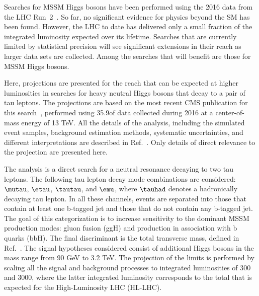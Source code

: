 Searches for MSSM Higgs bosons have been performed using
the 2016 data from the LHC Run~2~\cite{HIG-18-014,HIG-16-018,HIG-17-020}.
So far,
no significant evidence for physics beyond the SM has been found.
However, the LHC to date has delivered only a small fraction of the
integrated luminosity expected over its lifetime.
Searches that are currently limited by statistical precision
will see significant extensions in their reach as larger data sets are collected.
Among the searches that will benefit are those for MSSM Higgs bosons.

Here,
projections are presented for the reach that can be expected at higher luminosities
in searches for heavy neutral Higgs bosons that decay to a pair of tau leptons.
The projections are based on the most recent CMS publication
for this search~\cite{HIG-17-020},
performed using 35.9\fbinv of data collected during 2016
at a center-of-mass energy of 13 TeV.
All the details of the analysis,
including the simulated event samples, background estimation methods,
systematic uncertainties, and different interpretations are described in Ref.~\cite{HIG-17-020}.
Only details of direct relevance to the projection are presented here.

The analysis is a direct search for a neutral resonance
decaying to two tau leptons.
The following tau lepton decay mode combinations are considered: $\mutau$, $\etau$,
$\tautau$, and $\emu$, where $\tauhad$ denotes a hadronically decaying tau lepton.
In all these channels, events are separated into those that contain
at least one b-tagged jet and those that do not contain any b-tagged jet. 
The goal of this categorization is to increase sensitivity to the dominant MSSM production modes: 
gluon fusion (ggH) and production in association with b quarks (bbH).
The final discriminant is the total 
transverse mass, defined in Ref.~\cite{HIG-17-020}.
The signal hypotheses considered consist of additional Higgs
bosons in the mass range from 90 GeV to 3.2 TeV.
The projection of the limits %
is performed by scaling all the signal
and background processes to integrated luminosities
of 300 and 3000\fbinv,
where the latter integrated luminosity corresponds to the total that is
expected for the High-Luminosity LHC (HL-LHC). 

